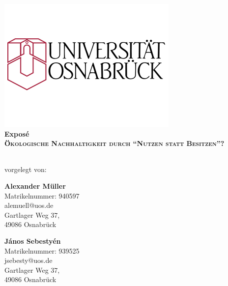 \documentclass[11pt, titlepage=true]{scrartcl} %
\makeatletter
\newcommand{\autorOne}{Alexander Müller}
\newcommand{\matrikelnrOne}{940597}
\newcommand{\adresseOne}{Gartlager Weg 37, \\49086 Osnabrück}
\newcommand{\emailOne}{alemuell@uos.de}
\newcommand{\autorTwo}{János Sebestyén}
\newcommand{\matrikelnrTwo}{939525}
\newcommand{\adresseTwo}{Gartlager Weg 37, \\49086 Osnabrück}
\newcommand{\emailTwo}{jsebesty@uos.de}
\newcommand{\titel}{Ökologische Nachhaltigkeit durch \enquote{Nutzen statt Besitzen}?}
\newcommand{\stitle}{}
\newcommand{\art}{Exposé}
\makeatother
\begin{document}
\begin{titlepage}
  \begin{center}
    \includegraphics[scale=0.5]{Logo-Uni-Osnabrueck.jpg}\\[3ex]

    \vfill
    \LARGE{\textbf{\art}}\\[1.5ex]
    \huge{\textbf{\textsc{\titel}}}\\[1.0ex]
    \LARGE{\textbf{\stitle}}\\[6ex]
    \vfill

    \normalsize
    vorgelegt von:\\[12pt]

      \begin{minipage}[]{0.30\textwidth}
        \textbf{\autorOne}\\
        Matrikelnummer: \matrikelnrOne\\
        \emailOne\\
        \adresseOne\\
      \end{minipage}
      \hspace{0.15\textwidth}
      \begin{minipage}[]{0.3\textwidth}
        \textbf{\autorTwo}\\
        Matrikelnummer: \matrikelnrTwo\\
        \emailTwo\\
        \adresseTwo\\
      \end{minipage}


\end{center}
\end{titlepage}
\end{document}
